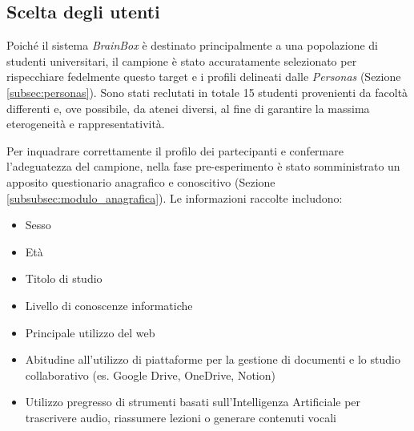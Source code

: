 \subsection{Scelta degli utenti}
Poiché il sistema \textit{BrainBox} è destinato principalmente a una popolazione di studenti universitari, il campione è stato accuratamente selezionato per rispecchiare fedelmente questo target e i profili delineati dalle \textit{Personas} (Sezione \ref{subsec:personas}). Sono stati reclutati in totale 15 studenti provenienti da facoltà differenti e, ove possibile, da atenei diversi, al fine di garantire la massima eterogeneità e rappresentatività. 

Per inquadrare correttamente il profilo dei partecipanti e confermare l'adeguatezza del campione, nella fase pre-esperimento è stato somministrato un apposito questionario anagrafico e conoscitivo (Sezione \ref{subsubsec:modulo_anagrafica}). Le informazioni raccolte includono: 

\begin{itemize}
  \item Sesso
  \item Età
  \item Titolo di studio
  \item Livello di conoscenze informatiche
  \item Principale utilizzo del web
  \item Abitudine all'utilizzo di piattaforme per la gestione di documenti e lo studio collaborativo (es. Google Drive, OneDrive, Notion)
  \item Utilizzo pregresso di strumenti basati sull'Intelligenza Artificiale per trascrivere audio, riassumere lezioni o generare contenuti vocali
\end{itemize}